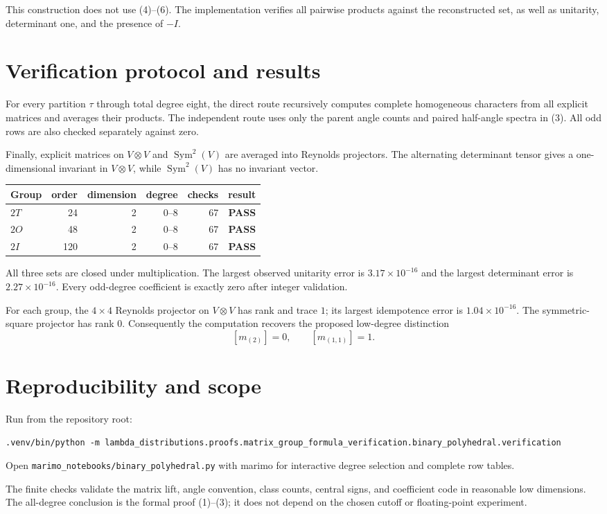 \documentclass[11pt]{article}
\newcommand{\Sym}{\operatorname{Sym}}
\newcommand{\PASS}{\textcolor{passgreen}{\textbf{PASS}}}
\begin{document}
This construction does not use (4)--(6).  The implementation verifies all
pairwise products against the reconstructed set, as well as unitarity,
determinant one, and the presence of $-I$.

\section{Verification protocol and results}

For every partition $\tau$ through total degree eight, the direct route
recursively computes complete homogeneous characters from all explicit
matrices and averages their products.  The independent route uses only the
parent angle counts and paired half-angle spectra in (3).  All odd rows are
also checked separately against zero.

Finally, explicit matrices on $V\otimes V$ and $\Sym^2(V)$ are averaged into
Reynolds projectors.  The alternating determinant tensor gives a one-dimensional
invariant in $V\otimes V$, while $\Sym^2(V)$ has no invariant vector.

\begin{center}
\begin{tabularx}{\linewidth}{@{}Xrrrrc@{}}
\toprule
Group & order & dimension & degree & checks & result\\
\midrule
$2T$ & 24 & 2 & $0$--$8$ & 67 & \PASS\\
$2O$ & 48 & 2 & $0$--$8$ & 67 & \PASS\\
$2I$ & 120 & 2 & $0$--$8$ & 67 & \PASS\\
\bottomrule
\end{tabularx}
\end{center}

All three sets are closed under multiplication.  The largest observed
unitarity error is $3.17\times10^{-16}$ and the largest determinant error is
$2.27\times10^{-16}$.  Every odd-degree coefficient is exactly zero after
integer validation.

For each group, the $4\times4$ Reynolds projector on $V\otimes V$ has rank and
trace $1$; its largest idempotence error is $1.04\times10^{-16}$.  The
symmetric-square projector has rank $0$.  Consequently the computation
recovers the proposed low-degree distinction
\[
[m_{(2)}]=0,\qquad [m_{(1,1)}]=1.
\]

\section{Reproducibility and scope}

Run from the repository root:
{\scriptsize
\begin{verbatim}
.venv/bin/python -m lambda_distributions.proofs.matrix_group_formula_verification.binary_polyhedral.verification
\end{verbatim}
}
Open \texttt{marimo\_notebooks/binary\_polyhedral.py} with marimo for interactive
degree selection and complete row tables.

The finite checks validate the matrix lift, angle convention, class counts,
central signs, and coefficient code in reasonable low dimensions.  The
all-degree conclusion is the formal proof (1)--(3); it does not depend on the
chosen cutoff or floating-point experiment.
\end{document}
